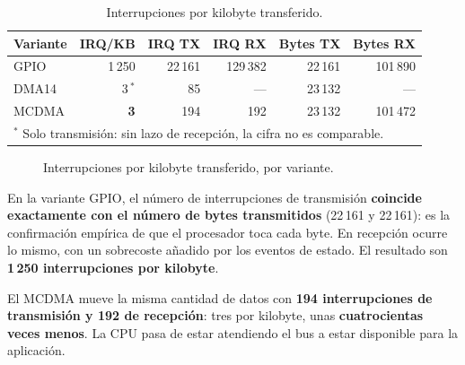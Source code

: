 \begin{table}[H]
    \centering
    \begin{tabular}{lrrrrr}
        \hline
        \textbf{Variante} & \textbf{IRQ/KB} & \textbf{IRQ TX} & \textbf{IRQ RX} & \textbf{Bytes TX} & \textbf{Bytes RX} \\
        \hline
        GPIO  & 1\,250 & 22\,161 & 129\,382 & 22\,161 & 101\,890 \\
        DMA14 & 3\,$^{*}$ & 85 & --- & 23\,132 & --- \\
        MCDMA & \textbf{3} & 194 & 192 & 23\,132 & 101\,472 \\
        \hline
        \multicolumn{6}{l}{\footnotesize $^{*}$ Solo transmisión: sin lazo de recepción, la cifra no es comparable.} \\
    \end{tabular}
    \caption{Interrupciones por kilobyte transferido.}
    \label{tab:bench_irq}
\end{table}

\begin{figure}[htbp]
    \centering
    \caption{Interrupciones por kilobyte transferido, por variante.}
    \label{fig:bench_irq}
\end{figure}

En la variante GPIO, el número de interrupciones de transmisión
\textbf{coincide exactamente con el número de bytes transmitidos} (22\,161 y 22\,161): es la
confirmación empírica de que el procesador toca cada byte. En recepción ocurre lo mismo, con un
sobrecoste añadido por los eventos de estado. El resultado son \textbf{1\,250 interrupciones por
kilobyte}.

El MCDMA mueve la misma cantidad de datos con \textbf{194 interrupciones de transmisión y 192 de
recepción}: tres por kilobyte, unas \textbf{cuatrocientas veces menos}. La CPU pasa de estar
atendiendo el bus a estar disponible para la aplicación.

